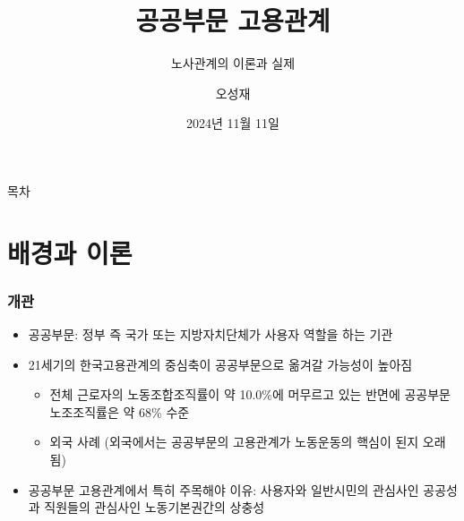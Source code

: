 \documentclass[aspectratio=169,xcolor=dvipsnames,handout]{beamer}
\title{공공부문 고용관계}
\subtitle{노사관계의 이론과 실제}
\author{오성재}
\institute[CNU]
{\relax
    충남대학교 경제학과\
    }
\date{2024년 11월 11일}
\begin{document}

\frame{\titlepage}

\begin{frame}{목차}
    \small
    \tableofcontents[hideallsubsections]
\end{frame}

\section{배경과 이론}
\begin{frame}
    \frametitle{개관}
    \begin{itemize}[<+->]
        \item 공공부문: 정부 즉 국가 또는 지방자치단체가 사용자 역할을 하는 기관 
        \item 21세기의 한국고용관계의 중심축이 공공부문으로 옮겨갈 가능성이 높아짐 
        \begin{itemize}
            \item 전체 근로자의 노동조합조직률이 약 10.0\%에 머무르고 있는 반면에 공공부문 노조조직률은 약 68\% 수준
            \item 외국 사례 (외국에서는 공공부문의 고용관계가 노동운동의 핵심이 된지 오래됨)
        \end{itemize}
        \item 공공부문 고용관계에서 특히 주목해야 이유: 사용자와 일반시민의 관심사인 공공성과 직원들의 관심사인 노동기본권간의 상충성
    \end{itemize}
\end{frame}
\end{document}

